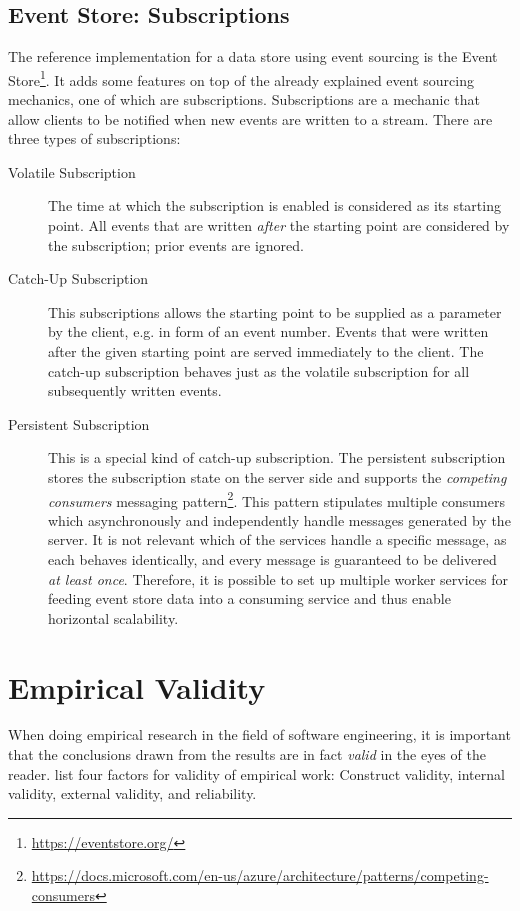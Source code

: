 \subsection{Event Store: Subscriptions}

The reference implementation for a data store using event sourcing is the Event Store\footnote{\url{https://eventstore.org/}}.
It adds some features on top of the already explained event sourcing mechanics, one of which are subscriptions.
Subscriptions are a mechanic that allow clients to be notified when new events are written to a stream.
There are three types of subscriptions:

\begin{description}
\item[Volatile Subscription]
The time at which the subscription is enabled is considered as its starting point.
All events that are written \emph{after} the starting point are considered by the subscription; prior events are ignored.
\item[Catch-Up Subscription]
This subscriptions allows the starting point to be supplied as a parameter by the client, e.g. in form of an event number.
Events that were written after the given starting point are served immediately to the client.
The catch-up subscription behaves just as the volatile subscription for all subsequently written events.
\item[Persistent Subscription] 
This is a special kind of catch-up subscription.
The persistent subscription stores the subscription state on the server side and supports the \emph{competing consumers} messaging pattern\footnote{\url{https://docs.microsoft.com/en-us/azure/architecture/patterns/competing-consumers}}.
This pattern stipulates multiple consumers which asynchronously and independently handle messages generated by the server.
It is not relevant which of the services handle a specific message, as each behaves identically, and every message is guaranteed to be delivered \emph{at least once}.
Therefore, it is possible to set up multiple worker services for feeding event store data into a consuming service and thus enable horizontal scalability.
\end{description}

\section{Empirical Validity}
\label{sec:fundamentals:evaluation}

When doing empirical research in the field of software engineering, it is important that the conclusions drawn from the results are in fact \emph{valid} in the eyes of the reader.
\citet{Easterbrook2008} list four factors for validity of empirical work: Construct validity, internal validity, external validity, and reliability.

